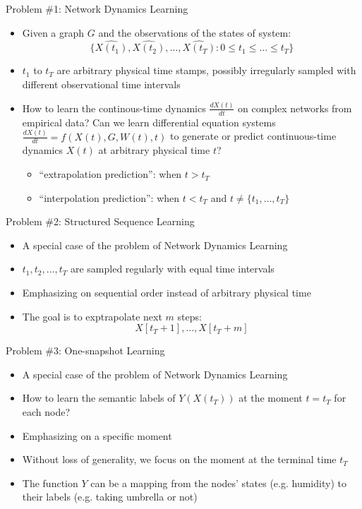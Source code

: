 \documentclass{beamer}
\begin{document}
\begin{frame}{Problem \#1: Network Dynamics Learning}
\begin{itemize}
\item Given a graph $G$ and the observations of the states of system:\[
\{\hat{X(t_1)},\hat{X(t_2)},\dots,\hat{X(t_T)}:0\leqslant t_1\leqslant\dots\leqslant t_T\}
\]
\item $t_1$ to $t_T$ are arbitrary physical time stamps, possibly irregularly sampled with different observational time intervals
\item How to learn the continous-time dynamics $\frac{dX(t)}{dt}$ on complex networks from empirical data? Can we learn differential equation systems $\frac{dX(t)}{dt}=f(X(t),G,W(t),t)$ to generate or predict continuous-time dynamics $X(t)$ at arbitrary physical time $t$?
\begin{itemize}
\item ``extrapolation prediction'': when $t>t_T$
\item ``interpolation prediction'': when $t<t_T$ and $t\ne\{t_1,\dots,t_T\}$ 
\end{itemize}
\end{itemize}
\end{frame}

\begin{frame}{Problem \#2: Structured Sequence Learning}
\begin{itemize}
\item A special case of the problem of Network Dynamics Learning
\item $t_1,t_2,\dots,t_T$ are sampled regularly with equal time intervals
\item Emphasizing on sequential order instead of arbitrary physical time
\item The goal is to exptrapolate next $m$ steps:\[
X[t_T+1],\dots,X[t_T+m]
\]
\end{itemize}
\end{frame}

\begin{frame}{Problem \#3: One-snapshot Learning}
\begin{itemize}
\item A special case of the problem of Network Dynamics Learning
\item How to learn the semantic labels of $Y(X(t_T))$ at the moment $t=t_T$ for each node?
\item Emphasizing on a specific moment
\item Without loss of generality, we focus on the moment at the terminal time $t_T$
\item The function $Y$ can be a mapping from the nodes' states (e.g. humidity) to their labels (e.g. taking umbrella or not)
\end{itemize}
\end{frame}
\end{document}

